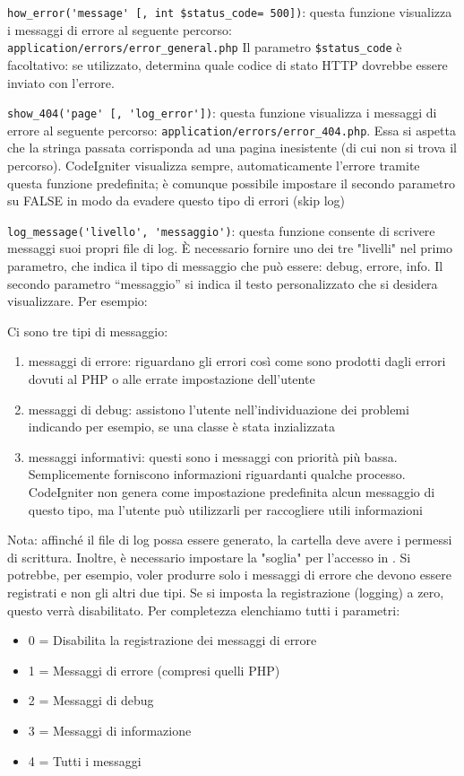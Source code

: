\verb|how_error('message' [, int $status_code= 500])|: questa funzione visualizza i messaggi di errore al seguente percorso: \verb|application/errors/error_general.php| Il parametro \verb|$status_code| è facoltativo: se utilizzato, determina quale codice di stato HTTP dovrebbe essere inviato con l'errore.

\verb|show_404('page' [, 'log_error'])|: questa funzione visualizza i messaggi di errore al seguente percorso: \verb|application/errors/error_404.php|. Essa si aspetta che la stringa passata corrisponda ad una pagina inesistente (di cui non si trova il percorso). CodeIgniter visualizza sempre, automaticamente l'errore tramite questa funzione predefinita; è comunque possibile impostare il secondo parametro su FALSE in modo da evadere questo tipo di errori (skip log)


\verb|log_message('livello', 'messaggio')|: questa funzione consente di scrivere messaggi suoi propri file di log. È necessario fornire uno dei tre "livelli" nel primo parametro, che indica il tipo di messaggio che può essere: debug, errore, info. Il secondo parametro ``messaggio'' si indica il testo personalizzato che si desidera visualizzare. Per esempio:


Ci sono tre tipi di messaggio:
\begin{enumerate}
\item messaggi di errore: riguardano gli errori così come sono prodotti dagli errori dovuti al PHP o alle errate impostazione dell'utente
\item messaggi di debug: assistono l'utente nell'individuazione dei problemi indicando per esempio, se una classe è stata inzializzata
\item messaggi informativi: questi sono i messaggi con priorità più bassa. Semplicemente forniscono informazioni riguardanti qualche processo. CodeIgniter non genera come impostazione predefinita alcun messaggio di questo tipo, ma l'utente può utilizzarli per raccogliere utili informazioni
\end{enumerate}

Nota: affinché il file di log possa essere generato, la cartella  deve avere i permessi di scrittura. Inoltre, è necessario impostare la "soglia" per l'accesso in . Si potrebbe, per esempio, voler produrre solo i messaggi di errore che devono essere registrati e non gli altri due tipi. Se si imposta la registrazione (logging) a zero, questo verrà disabilitato. Per completezza elenchiamo tutti i parametri:

\begin{itemize}
\item 0 = Disabilita la registrazione dei messaggi di errore
\item 1 = Messaggi di errore (compresi quelli PHP)
\item 2 = Messaggi di debug
\item 3 = Messaggi di informazione
\item 4 = Tutti i messaggi
\end{itemize}

